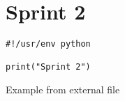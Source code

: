 \section{Sprint 2}



\begin{listing}[ht]
\begin{verbatim}
#!/usr/env python

print("Sprint 2")
\end{verbatim}
\caption{Example from external file}
\label{listing:3}
\end{listing}
